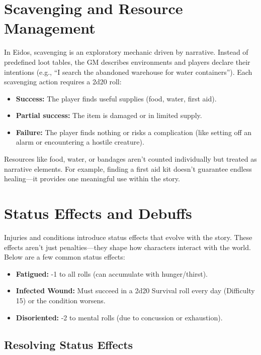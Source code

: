 \documentclass[12pt]{book}  %
\begin{document}
\section{Scavenging and Resource Management}

In Eidos, scavenging is an exploratory mechanic driven by narrative. Instead of predefined loot tables, the GM describes environments and players declare their intentions (e.g., “I search the abandoned warehouse for water containers”). Each scavenging action requires a 2d20 roll:

\begin{itemize}
    \item \textbf{Success:} The player finds useful supplies (food, water, first aid).
    \item \textbf{Partial success:} The item is damaged or in limited supply.
    \item \textbf{Failure:} The player finds nothing or risks a complication (like setting off an alarm or encountering a hostile creature).
\end{itemize}

Resources like food, water, or bandages aren’t counted individually but treated as narrative elements. For example, finding a first aid kit doesn’t guarantee endless healing—it provides one meaningful use within the story.

\section{Status Effects and Debuffs}

Injuries and conditions introduce status effects that evolve with the story. These effects aren’t just penalties—they shape how characters interact with the world. Below are a few common status effects:

\begin{itemize}
    \item \textbf{Fatigued:} -1 to all rolls (can accumulate with hunger/thirst).
    \item \textbf{Infected Wound:} Must succeed in a 2d20 Survival roll every day (Difficulty 15) or the condition worsens.
    \item \textbf{Disoriented:} -2 to mental rolls (due to concussion or exhaustion).
\end{itemize}

\subsection{Resolving Status Effects}
\end{document}
